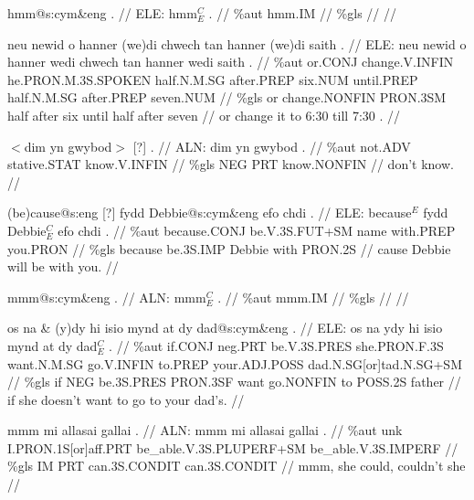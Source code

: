 \documentclass[a4paper,10pt]{article}
\begin{document}
\ex
\begingl[lingstyle=gergl]
\glchat hmm@s:cym\&eng . //
\glsurface ELE:  hmm$^{C}_{E}$ .  //
\glauto \%aut  hmm{\scriptsize .IM}   //
\glmanual \%gls     //
\gleng  //
\endgl
\xe

\ex
\begingl[lingstyle=gergl]
\glchat neu newid o hanner (we)di chwech tan hanner (we)di saith . //
\glsurface ELE:  neu newid o hanner wedi chwech tan hanner wedi saith .  //
\glauto \%aut  or{\scriptsize .CONJ} change{\scriptsize .V.INFIN} he{\scriptsize .PRON.M.3S.SPOKEN} half{\scriptsize .N.M.SG} after{\scriptsize .PREP} six{\scriptsize .NUM} until{\scriptsize .PREP} half{\scriptsize .N.M.SG} after{\scriptsize .PREP} seven{\scriptsize .NUM}   //
\glmanual \%gls  or change{\scriptsize .NONFIN} PRON{\scriptsize .3SM} half after six until half after seven   //
\gleng or change it to 6:30 till 7:30 . //
\endgl
\xe

\ex
\begingl[lingstyle=gergl]
\glchat $<$dim yn gwybod$>$ [?] . //
\glsurface ALN:  dim yn gwybod .  //
\glauto \%aut  not{\scriptsize .ADV} stative{\scriptsize .STAT} know{\scriptsize .V.INFIN}   //
\glmanual \%gls  NEG PRT know{\scriptsize .NONFIN}   //
\gleng don't know. //
\endgl
\xe

\ex
\begingl[lingstyle=gergl]
\glchat (be)cause@s:eng [?] fydd Debbie@s:cym\&eng efo chdi . //
\glsurface ELE:  because$^{E}$ fydd Debbie$^{C}_{E}$ efo chdi .  //
\glauto \%aut  because{\scriptsize .CONJ} be{\scriptsize .V.3S.FUT+SM} name with{\scriptsize .PREP} you{\scriptsize .PRON}   //
\glmanual \%gls  because be{\scriptsize .3S.IMP} Debbie with PRON{\scriptsize .2S}   //
\gleng cause Debbie will be with you. //
\endgl
\xe

\ex
\begingl[lingstyle=gergl]
\glchat mmm@s:cym\&eng . //
\glsurface ALN:  mmm$^{C}_{E}$ .  //
\glauto \%aut  mmm{\scriptsize .IM}   //
\glmanual \%gls     //
\gleng  //
\endgl
\xe

\ex
\begingl[lingstyle=gergl]
\glchat os na \& (y)dy hi isio mynd at dy dad@s:cym\&eng . //
\glsurface ELE:  os na ydy hi isio mynd at dy dad$^{C}_{E}$ .  //
\glauto \%aut  if{\scriptsize .CONJ} neg{\scriptsize .PRT} be{\scriptsize .V.3S.PRES} she{\scriptsize .PRON.F.3S} want{\scriptsize .N.M.SG} go{\scriptsize .V.INFIN} to{\scriptsize .PREP} your{\scriptsize .ADJ.POSS} dad{\scriptsize .N.SG[or]tad.N.SG+SM}   //
\glmanual \%gls  if NEG be{\scriptsize .3S.PRES} PRON{\scriptsize .3SF} want go{\scriptsize .NONFIN} to POSS{\scriptsize .2S} father   //
\gleng if she doesn't want to go to your dad's. //
\endgl
\xe

\ex
\begingl[lingstyle=gergl]
\glchat mmm mi allasai gallai . //
\glsurface ALN:  mmm mi allasai gallai .  //
\glauto \%aut  unk I{\scriptsize .PRON.1S[or]aff.PRT} be\_able{\scriptsize .V.3S.PLUPERF+SM} be\_able{\scriptsize .V.3S.IMPERF}   //
\glmanual \%gls  IM PRT can{\scriptsize .3S.CONDIT} can{\scriptsize .3S.CONDIT}   //
\gleng mmm, she could, couldn't she //
\endgl
\xe
\end{document}
